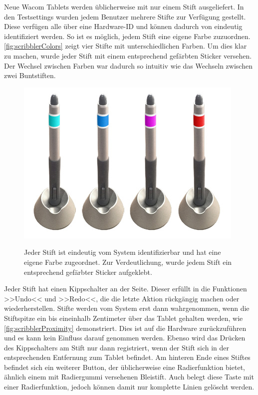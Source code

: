 \medskip Neue Wacom Tablets werden üblicherweise mit nur einem Stift ausgeliefert. In den Testsettings wurden jedem Benutzer mehrere Stifte zur Verfügung gestellt. Diese verfügen alle über eine Hardware-ID und können dadurch von \scribbler eindeutig identifiziert werden. So ist es möglich, jedem Stift eine eigene Farbe zuzuordnen. \autoref{fig:scribblerColors} zeigt vier Stifte mit unterschiedlichen Farben. Um dies klar zu machen, wurde jeder Stift mit einem entsprechend gefärbten Sticker versehen. Der Wechsel zwischen Farben war dadurch so intuitiv wie das Wechseln zwischen zwei Buntstiften.

\begin{figure}
        {\includegraphics[width=1\linewidth]{gfx/scribblerColors}}
		\caption[Tabletstiftfarben]{Jeder Stift ist eindeutig vom System identifizierbar und hat eine eigene Farbe zugeordnet. Zur Verdeutlichung, wurde jedem Stift ein entsprechend gefärbter Sticker aufgeklebt.}\label{fig:scribblerColors}
\end{figure}

Jeder Stift hat einen Kippschalter an der Seite. Dieser erfüllt in \scribbler die Funktionen >>Undo<< und >>Redo<<, die die letzte Aktion rückgängig machen oder wiederherstellen. 
Stifte werden vom System erst dann wahrgenommen, wenn die Stiftspitze ein bis eineinhalb Zentimeter über das Tablet gehalten werden, wie \autoref{fig:scribblerProximity} demonstriert. Dies ist auf die Hardware zurückzuführen und es kann kein Einfluss darauf genommen werden. Ebenso wird das Drücken des Kippschalters am Stift nur dann registriert, wenn der Stift sich in der entsprechenden Entfernung zum Tablet befindet. Am hinteren Ende eines Stiftes befindet sich ein weiterer Button, der üblicherweise eine Radierfunktion bietet, ähnlich einem mit Radiergummi versehenen Bleistift. Auch \scribbler belegt diese Taste mit einer Radierfunktion, jedoch können damit nur komplette Linien gelöscht werden.

